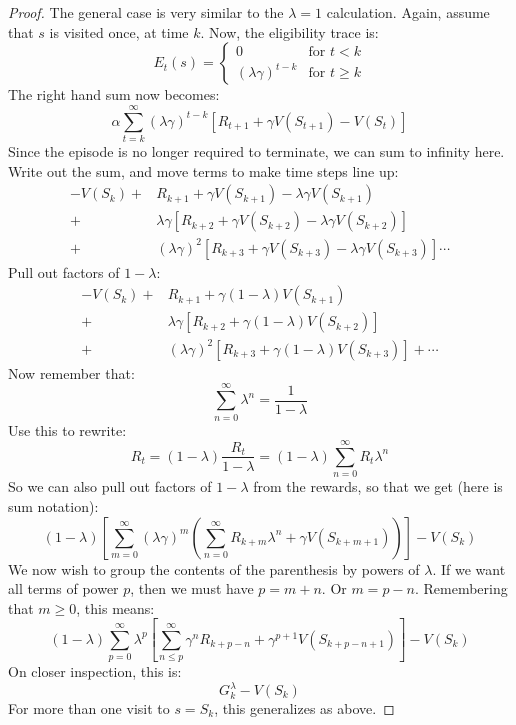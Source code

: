 \documentclass[12pt, a4paper]{article}
\numberwithin{equation}{section}
\begin{document}
\begin{proof}
The general case is very similar to the $\lambda=1$ calculation. Again, assume that $s$ is visited once, at time $k$. Now, the eligibility trace is:
\begin{equation}
E_t(s)=\begin{cases}
0 & \textrm{for }t<k \\
(\lambda\gamma)^{t-k} & \textrm{for }t\ge k
\end{cases}
\end{equation}
The right hand sum now becomes:
\begin{equation}
\alpha\sum_{t=k}^\infty(\lambda\gamma)^{t-k}\left[R_{t+1}+\gamma V(S_{t+1})-V(S_t)\right]
\end{equation}
Since the episode is no longer required to terminate, we can sum to infinity here. Write out the sum, and move terms to make time steps line up:
\begin{align}
-V(S_k)+&R_{k+1}+\gamma V(S_{k+1})-\lambda\gamma V(S_{k+1})\\
+&\lambda\gamma\left[R_{k+2}+\gamma V(S_{k+2})-\lambda\gamma V(S_{k+2})\right]\\
+&(\lambda\gamma)^2\left[R_{k+3}+\gamma V(S_{k+3})-\lambda\gamma V(S_{k+3})\right]\cdots
\end{align}
Pull out factors of $1-\lambda$:
\begin{align}
-V(S_k)+&R_{k+1}+\gamma(1-\lambda)V(S_{k+1})\\
+&\lambda\gamma\left[R_{k+2}+\gamma(1-\lambda)V(S_{k+2})\right]\\
+&(\lambda\gamma)^2\left[R_{k+3}+\gamma(1-\lambda)V(S_{k+3})\right]+\cdots
\end{align}
Now remember that:
\begin{equation}
\sum_{n=0}^\infty\lambda^n=\frac{1}{1-\lambda}
\end{equation}
Use this to rewrite:
\begin{equation}
R_t=(1-\lambda)\frac{R_t}{1-\lambda}=(1-\lambda)\sum_{n=0}^\infty R_t\lambda^n
\end{equation}
So we can also pull out factors of $1-\lambda$ from the rewards, so that we get (here is sum notation):
\begin{equation}
(1-\lambda)\left[\sum_{m=0}^\infty(\lambda\gamma)^m\left(\sum_{n=0}^\infty R_{k+m}\lambda^n+\gamma V(S_{k+m+1})\right)\right]-V(S_k)
\end{equation}
We now wish to group the contents of the parenthesis by powers of $\lambda$. If we want all terms of power $p$, then we must have $p=m+n$. Or $m=p-n$. Remembering that $m\ge 0$, this means:
\begin{equation}
(1-\lambda)\sum_{p=0}^\infty\lambda^p\left[\sum_{n\le p}^\infty \gamma^n R_{k+p-n}+\gamma^{p+1}V(S_{k+p-n+1})\right]-V(S_k)
\end{equation}
On closer inspection, this is:
\begin{equation}
G^\lambda_k-V(S_k)
\end{equation}
For more than one visit to $s=S_k$, this generalizes as above.
\end{proof}
\end{document}
